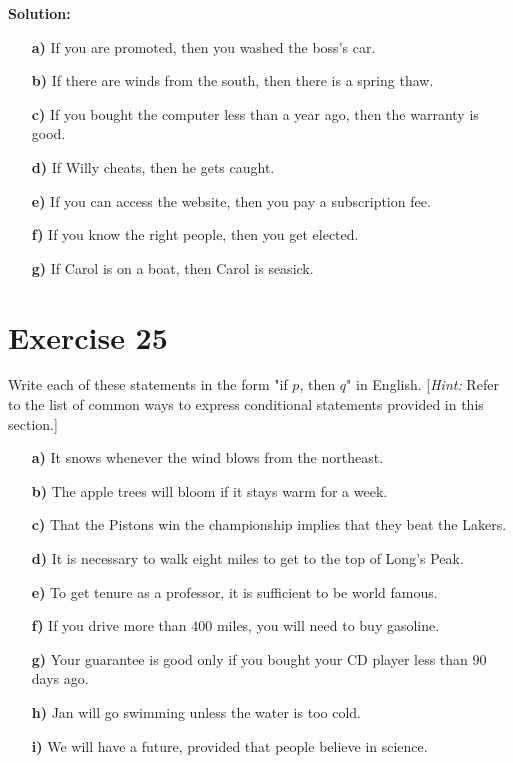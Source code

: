 \documentclass{Axon}
\begin{document}
\noindent
\textbf{Solution:}
\begin{enumerate}
    \item[\textbf{a)}] If you are promoted, then you washed the boss's car.
    \item[\textbf{b)}] If there are winds from the south, then there is a spring thaw.
    \item[\textbf{c)}] If you bought the computer less than a year ago, then the warranty is good.
    \item[\textbf{d)}] If Willy cheats, then he gets caught.
    \item[\textbf{e)}] If you can access the website, then you pay a subscription fee.
    \item[\textbf{f)}] If you know the right people, then you get elected.
    \item[\textbf{g)}] If Carol is on a boat, then Carol is seasick.
\end{enumerate}

\section*{Exercise 25}
Write each of these statements in the form "if \(p\), then \(q\)" in English. [\textit{Hint:} Refer to the list of common ways to express conditional statements provided in this section.]
\begin{enumerate}
    \item[\textbf{a)}] It snows whenever the wind blows from the northeast.
    \item[\textbf{b)}] The apple trees will bloom if it stays warm for a week.
    \item[\textbf{c)}] That the Pistons win the championship implies that they beat the Lakers.
    \item[\textbf{d)}] It is necessary to walk eight miles to get to the top of Long's Peak.
    \item[\textbf{e)}] To get tenure as a professor, it is sufficient to be world famous.
    \item[\textbf{f)}] If you drive more than \(400\) miles, you will need to buy gasoline.
    \item[\textbf{g)}] Your guarantee is good only if you bought your CD player less than \(90\) days ago.
    \item[\textbf{h)}] Jan will go swimming unless the water is too cold.
    \item[\textbf{i)}] We will have a future, provided that people believe in science.
\end{enumerate}
\end{document}
